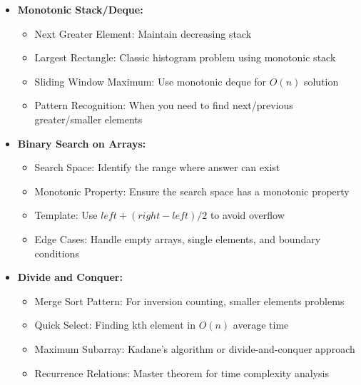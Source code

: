 \documentclass[a4paper,10pt]{book}
\begin{document}
\begin{itemize}[leftmargin=*]
    \item \textbf{Monotonic Stack/Deque:}
    \begin{itemize}
        \item Next Greater Element: Maintain decreasing stack
        \item Largest Rectangle: Classic histogram problem using monotonic stack
        \item Sliding Window Maximum: Use monotonic deque for $O(n)$ solution
        \item Pattern Recognition: When you need to find next/previous greater/smaller elements
    \end{itemize}
    
    \item \textbf{Binary Search on Arrays:}
    \begin{itemize}
        \item Search Space: Identify the range where answer can exist
        \item Monotonic Property: Ensure the search space has a monotonic property
        \item Template: Use $left + (right - left) / 2$ to avoid overflow
        \item Edge Cases: Handle empty arrays, single elements, and boundary conditions
    \end{itemize}
    
    \item \textbf{Divide and Conquer:}
    \begin{itemize}
        \item Merge Sort Pattern: For inversion counting, smaller elements problems
        \item Quick Select: Finding kth element in $O(n)$ average time
        \item Maximum Subarray: Kadane's algorithm or divide-and-conquer approach
        \item Recurrence Relations: Master theorem for time complexity analysis
    \end{itemize}
\end{itemize}
\end{document}
